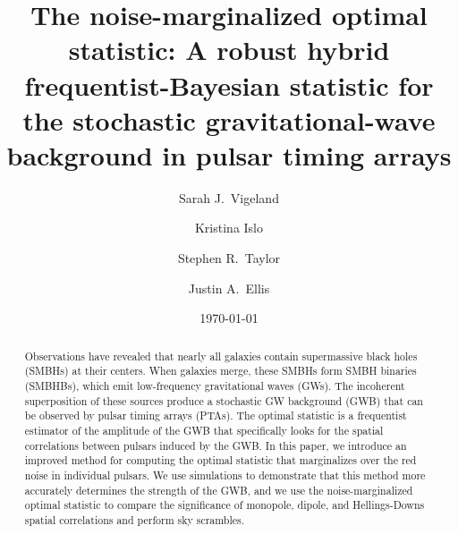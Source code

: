 \documentclass[twocolumn,aps,prd,superscriptaddress]{revtex4-1}
\begin{document}
\title{The noise-marginalized optimal statistic: A robust hybrid frequentist-Bayesian statistic for the stochastic gravitational-wave background in pulsar timing arrays}

\author{Sarah J.\ Vigeland}

\author{Kristina Islo}

\author{Stephen R.\ Taylor}

\author{Justin A.\ Ellis}


\date{\today}  

\begin{abstract}
Observations have revealed that nearly all galaxies 
contain supermassive black holes (SMBHs) at their centers. 
When galaxies merge, these SMBHs form SMBH binaries (SMBHBs), 
which emit low-frequency gravitational waves (GWs). 
The incoherent superposition of these sources produce a stochastic GW background (GWB) 
that can be observed by pulsar timing arrays (PTAs). 
The optimal statistic is a frequentist estimator of the amplitude of the GWB 
that specifically looks for the spatial correlations between pulsars induced by the GWB. 
In this paper, we introduce an improved method for computing the optimal statistic 
that marginalizes over the red noise in individual pulsars. 
We use simulations to demonstrate that this method 
more accurately determines the strength of the GWB, 
and we use the noise-marginalized optimal statistic 
to compare the significance of monopole, dipole, and Hellings-Downs spatial correlations 
and perform sky scrambles.
\end{abstract}
\end{document}
